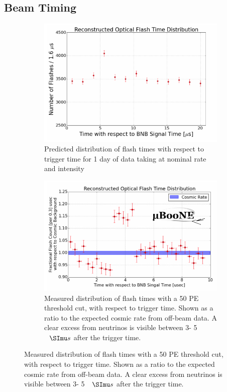 \subsection{Beam Timing}
\begin{figure}[htp!]
\centering
	\begin{subfigure}[b]{.6\textwidth}
	\includegraphics[width=\textwidth]{figs/flashrate_sim.png}
	\caption{Predicted distribution of flash times with respect to trigger time for 1 day of data taking at nominal rate and intensity}
	\label{fig:pe_sim}
	\end{subfigure}
	\quad
	\begin{subfigure}[b]{.6\textwidth}
	\includegraphics[width=\textwidth]{figs/flashrate.png}
	\caption{Measured distribution of flash times with a 50 PE threshold cut, with respect to trigger time. Shown as a ratio to the expected cosmic rate from off-beam data. A clear excess from neutrinos is visible between 3- 5 $\micro s$ after the trigger time. }
	\label{fig:pe_data}
	\end{subfigure}
	\quad
\label{fig:petime}
\end{figure}
